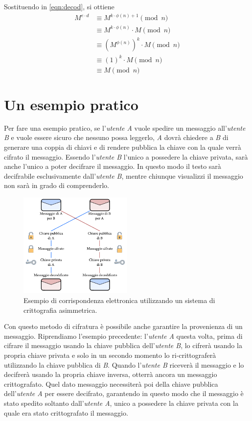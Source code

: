 Sostituendo in \eqref{eqn:decod}, si ottiene 
\begin{align*}
	M^{e \cdot d} &\equiv M^{k \cdot \phi(n) + 1} \pmod{n} \\
	&\equiv M^{k \cdot \phi(n)} \cdot M \pmod{n} \\
	&\equiv \left( M^{\phi(n)} \right)^k  \cdot M \pmod{n}\\
	&\equiv \left( 1 \right)^k \cdot M \pmod{n} \\
	&\equiv M \pmod{n}
\end{align*}

%
\section{Un esempio pratico}

Per fare una esempio pratico, se l'\emph{utente A} vuole spedire un messaggio all'\emph{utente B} e vuole essere sicuro che nessuno possa leggerlo, \emph{A} dovrà chiedere a \emph{B} di generare una coppia di chiavi e di rendere pubblica la chiave con la quale verrà cifrato il messaggio. Essendo l'\emph{utente B} l'unico a possedere la chiave privata, sarà anche l'unico a poter decifrare il messaggio. In questo modo il testo sarà decifrabile esclusivamente dall'\emph{utente B}, mentre chiunque visualizzi il messaggio non sarà in grado di comprenderlo.
\begin{figure}[h]
	\label{fig:rsa_disegno}
	\centering
	\includegraphics[width=0.5\textwidth]{figures/rsa_disegno}
	\caption{Esempio di corrispondenza elettronica utilizzando un sistema di crittografia asimmetrica.}
\end{figure}

Con questo metodo di cifratura è possibile anche garantire la provenienza di un messaggio. Riprendiamo l'esempio precedente: l'\emph{utente A} questa volta, prima di cifrare il messaggio usando la chiave pubblica dell'\emph{utente B}, lo cifrerà usando la propria chiave privata e solo in un secondo momento lo ri-crittograferà utilizzando la chiave pubblica di \emph{B}. Quando l'\emph{utente B} riceverà il messaggio e lo decifrerà usando la propria chiave inversa, otterrà ancora un messaggio crittografato. Quel dato messaggio necessiterà poi della chiave pubblica dell'\emph{utente A} per essere decifrato, garantendo in questo modo che il messaggio è stato spedito soltanto dall'\emph{utente A}, unico a possedere la chiave privata con la quale era stato crittografato il messaggio.

